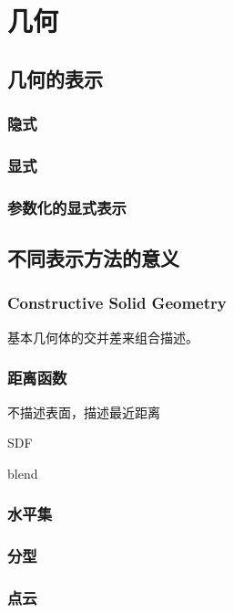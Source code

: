 \chapter{几何}

\section{几何的表示}

\subsection*{隐式}

\subsection*{显式}

\subsection*{参数化的显式表示}

\section{不同表示方法的意义}

\subsection*{Constructive Solid Geometry}

基本几何体的交并差来组合描述。

\subsection*{距离函数}

不描述表面，描述最近距离

SDF

blend

\subsection*{水平集}

\subsection*{分型}

\subsection*{点云}

